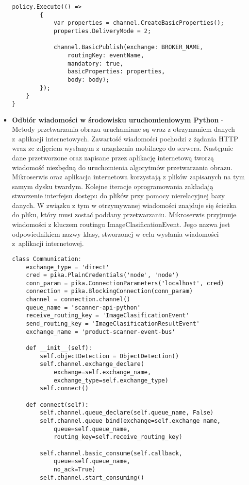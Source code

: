 \begin{itemize}
\begin{lstlisting}[caption={Metoda publikacji wiadomości.}, label={messagePublish}]
		policy.Execute(() =>
		{
			var properties = channel.CreateBasicProperties();
			properties.DeliveryMode = 2;
	
			channel.BasicPublish(exchange: BROKER_NAME,
				routingKey: eventName,
				mandatory: true,
				basicProperties: properties,
				body: body);
		});
	}
}
\end{lstlisting}
\item \textbf{Odbiór wiadomości w środowisku uruchomieniowym Python} - Metody przetwarzania obrazu uruchamiane są wraz z otrzymaniem danych z~aplikacji internetowych. Zawartość wiadomości pochodzi z żądania HTTP wraz ze zdjęciem wysłanym z urządzenia mobilnego do serwera. Następnie dane przetworzone oraz zapisane przez aplikację internetową tworzą wiadomość niezbędną do uruchomienia algorytmów przetwarzania obrazu. Mikroserwis oraz aplikacja internetowa korzystają z plików zapisanych na tym samym dysku twardym. Kolejne iteracje oprogramowania zakładają stworzenie interfejsu dostępu do plików przy pomocy nierelacyjnej bazy danych. W związku z tym w otrzymywanej wiadomości znajduje się ścieżka do pliku, który musi zostać poddany przetwarzaniu. Mikroserwis przyjmuje wiadomości z kluczem routingu ImageClasificationEvent. Jego nazwa jest odpowiednikiem nazwy klasy, stworzonej w celu wysłania wiadomości z~aplikacji internetowej. 

\begin{lstlisting}[caption={Połączenie do kolejki RabbitMQ.}]
class Communication:
	exchange_type = 'direct'
	cred = pika.PlainCredentials('node', 'node')
	conn_param = pika.ConnectionParameters('localhost', cred)
	connection = pika.BlockingConnection(conn_param)
	channel = connection.channel()
	queue_name = 'scanner-api-python'
	receive_routing_key = 'ImageClasificationEvent'
	send_routing_key = 'ImageClasificationResultEvent'
	exchange_name = 'product-scanner-event-bus'
	
	def __init__(self):
		self.objectDetection = ObjectDetection()
		self.channel.exchange_declare(
			exchange=self.exchange_name,
			exchange_type=self.exchange_type)
		self.connect()
	
	def connect(self):
		self.channel.queue_declare(self.queue_name, False)
		self.channel.queue_bind(exchange=self.exchange_name,
			queue=self.queue_name,
			routing_key=self.receive_routing_key)
		
		self.channel.basic_consume(self.callback,
			queue=self.queue_name,
			no_ack=True)
		self.channel.start_consuming()
\end{lstlisting}


\end{itemize}
